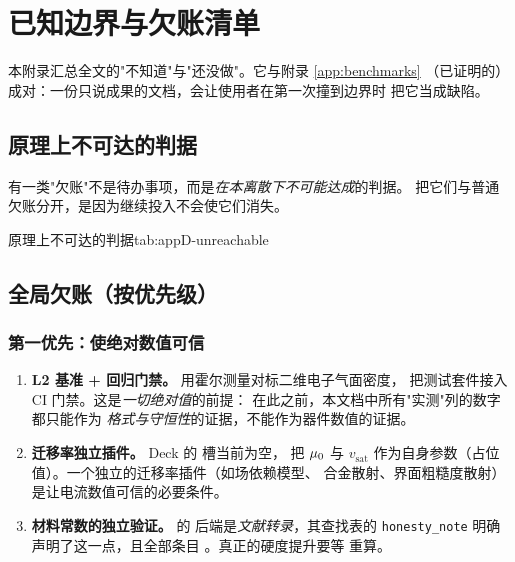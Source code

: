 
\chapter{已知边界与欠账清单}
\label{app:debts}

本附录汇总全文的"不知道"与"还没做"。它与附录 \ref{app:benchmarks}
（已证明的）成对：一份只说成果的文档，会让使用者在第一次撞到边界时
把它当成缺陷。

\section{原理上不可达的判据}

有一类"欠账"不是待办事项，而是\emph{在本离散下不可能达成}的判据。
把它们与普通欠账分开，是因为继续投入不会使它们消失。

\begin{veriftable}{原理上不可达的判据}{tab:appD-unreachable}
\end{veriftable}

\section{全局欠账（按优先级）}

\subsection*{第一优先：使绝对数值可信}

\begin{enumerate}[leftmargin=1.9em,itemsep=0.4em,topsep=0.4em]
  \item \textbf{L2 基准 + 回归门禁。} 用霍尔测量对标二维电子气面密度，
        把测试套件接入 CI 门禁。这是\emph{一切绝对值}的前提：
        在此之前，本文档中所有"实测"列的数字都只能作为
        \emph{格式与守恒性}的证据，不能作为器件数值的证据。
  \item \textbf{迁移率独立插件。} Deck 的  槽当前为空，
         把 $\mu_0$ 与 $v_{\text{sat}}$
        作为自身参数（占位值）。一个独立的迁移率插件（如场依赖模型、
        合金散射、界面粗糙度散射）是让电流数值可信的必要条件。
  \item \textbf{材料常数的独立验证。}  的
         后端是\emph{文献转录}，其查找表的
        \texttt{honesty\_note} 明确声明了这一点，且全部条目
        。真正的硬度提升要等
         重算。
\end{enumerate}

